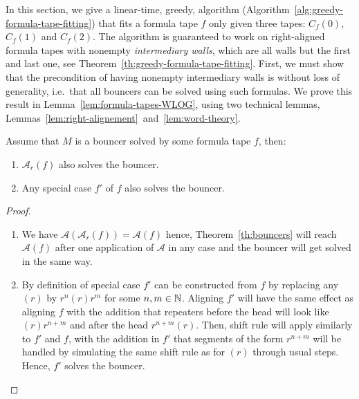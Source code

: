 In this section, we give a linear-time, greedy, algorithm (Algorithm~\ref{alg:greedy-formula-tape-fitting}) that fits a formula tape $f$ only given three tapes: $C_f(0)$, $C_f(1)$ and $C_f(2)$. The algorithm is guaranteed to work on right-aligned formula tapes with nonempty \textit{intermediary walls}, which are all walls but the first and last one, see Theorem~\ref{th:greedy-formula-tape-fitting}. First, we must show that the precondition of having nonempty intermediary walls is without loss of generality, i.e.\ that all bouncers can be solved using such formulas. We prove this result in Lemma~\ref{lem:formula-tapes-WLOG}, using two technical lemmas, Lemmas~\ref{lem:right-alignement}~and~\ref{lem:word-theory}.



\begin{lemma}\label{lem:right-alignement}
    Assume that $M$ is a bouncer solved by some formula tape $f$, then:
    \begin{enumerate}
        \item $\mathcal{A}_r(f)$ also solves the bouncer.
        \item Any special case $f'$ of $f$ also solves the bouncer.

    \end{enumerate}
\end{lemma}
\begin{proof}

    \begin{enumerate}
        \item We have $\mathcal{A}(\mathcal{A}_r(f)) = \mathcal{A}(f)$ hence, Theorem~\ref{th:bouncers} will reach $\mathcal{A}(f)$ after one application of $\mathcal{A}$ in any case and the bouncer will get solved in the same way.
        \item By definition of special case $f'$ can be constructed from $f$ by replacing any $(r)$ by $r^n(r)r^m$ for some $n,m\in\mathbb{N}$. Aligning $f'$ will have the same effect as aligning $f$ with the addition that repeaters before the head will look like $(r)r^{n+m}$  and after the head $r^{n+m}(r)$. Then, shift rule will apply similarly to $f'$ and $f$, with the addition in $f'$ that segments of the form $r^{n+m}$ will be handled by simulating the same shift rule as for $(r)$ through usual steps. Hence, $f'$ solves the bouncer.
    \end{enumerate}

\end{proof}

